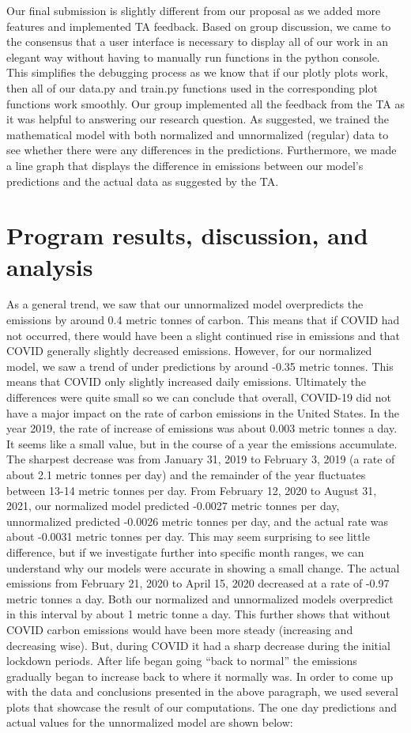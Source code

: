 \documentclass[fontsize=11pt]{article}
\begin{document}
Our final submission is slightly different from our proposal as we added more features and implemented TA feedback. Based on group discussion, we came to the consensus that a user interface is necessary to display all of our work in an elegant way without having to manually run functions in the python console. This simplifies the debugging process as we know that if our plotly plots work, then all of our data.py and train.py functions used in the corresponding plot functions work smoothly. Our group implemented all the feedback from the TA as it was helpful to answering our research question. As suggested, we trained the mathematical model with both normalized and unnormalized (regular) data to see whether there were any differences in the predictions. Furthermore, we made a line graph that displays the difference in emissions between our model’s predictions and the actual data as suggested by the TA.

\section{Program results, discussion, and analysis}

As a general trend, we saw that our unnormalized model overpredicts the emissions by around 0.4 metric tonnes of carbon. This means that if COVID had not occurred, there would have been a slight continued rise in emissions and that COVID generally slightly decreased emissions. However, for our normalized model, we saw a trend of under predictions by around -0.35 metric tonnes. This means that COVID only slightly increased daily emissions. Ultimately the differences were quite small so we can conclude that overall, COVID-19 did not have a major impact on the rate of carbon emissions in the United States. In the year 2019, the rate of increase of emissions was about 0.003 metric tonnes a day. It seems like a small value, but in the course of a year the emissions accumulate. The sharpest decrease was from January 31, 2019 to February 3, 2019 (a rate of about 2.1 metric tonnes per day) and the remainder of the year fluctuates between 13-14 metric tonnes per day. From February 12, 2020 to August 31, 2021, our normalized model predicted -0.0027 metric tonnes per day, unnormalized predicted -0.0026 metric tonnes per day, and the actual rate was about -0.0031 metric tonnes per day. This may seem surprising to see little difference, but if we investigate further into specific month ranges, we can understand why our models were accurate in showing a small change. The actual emissions from February 21, 2020 to April 15, 2020 decreased at a rate of -0.97 metric tonnes a day. Both our normalized and unnormalized models overpredict in this interval by about 1 metric tonne a day. This further shows that without COVID carbon emissions would have been more steady (increasing and decreasing wise). But, during COVID it had a sharp decrease during the initial lockdown periods. After life began going “back to normal” the emissions gradually began to increase back to where it normally was.  
In order to come up with the data and conclusions presented in the above paragraph, we used several plots that showcase the result of our computations. The one day predictions and actual values for the unnormalized model are shown below:
\end{document}
